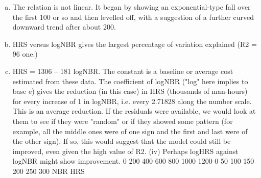 \documentclass[a4paper,12pt]{article}
\begin{document}
\begin{enumerate}[(a)]
\item 
The relation is not linear. It began by showing an exponential-type fall over
the first 100 or so and then levelled off, with a suggestion of a further curved
downward trend after about 200.
\item HRS versus logNBR gives the largest percentage of variation explained
(R2 = 96%
one.)
\item HRS = 1306 – 181 logNBR. The constant is a baseline or average cost
estimated from these data. The coefficient of logNBR ("log" here implies to
base e) gives the reduction (in this case) in HRS (thousands of man-hours) for
every increase of 1 in logNBR, i.e. every 2.71828 along the number scale.
This is an average reduction.
If the residuals were available, we would look at them to see if they were
"random" or if they showed some pattern (for example, all the middle ones
were of one sign and the first and last were of the other sign). If so, this would
suggest that the model could still be improved, even given the high value of
R2.
(iv) Perhaps logHRS against logNBR might show improvement.
0
200
400
600
800
1000
1200
0 50 100 150 200 250 300
NBR
HRS
\end{enumerate}
\end{document}

